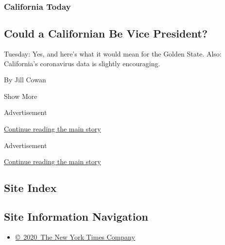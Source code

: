 \begin{enumerate}
  \hypertarget{california-today}{%
  \subsubsection{California Today}\label{california-today}}

  \hypertarget{could-a-californian-be-vice-president}{%
  \subsection{Could a Californian Be Vice
  President?}\label{could-a-californian-be-vice-president}}

  Tuesday: Yes, and here's what it would mean for the Golden State.
  Also: California's coronavirus data is slightly encouraging.

  By Jill Cowan
\end{enumerate}

Show More

Advertisement

\protect\hyperlink{after-mid2}{Continue reading the main story}

Advertisement

\protect\hyperlink{after-mktg}{Continue reading the main story}

\hypertarget{site-index}{%
\subsection{Site Index}\label{site-index}}

\hypertarget{site-information-navigation}{%
\subsection{Site Information
Navigation}\label{site-information-navigation}}

\begin{itemize}
\tightlist
\item
  \href{https://help.nytimes.com/hc/en-us/articles/115014792127-Copyright-notice}{©~2020~The
  New York Times Company}
\end{itemize}

